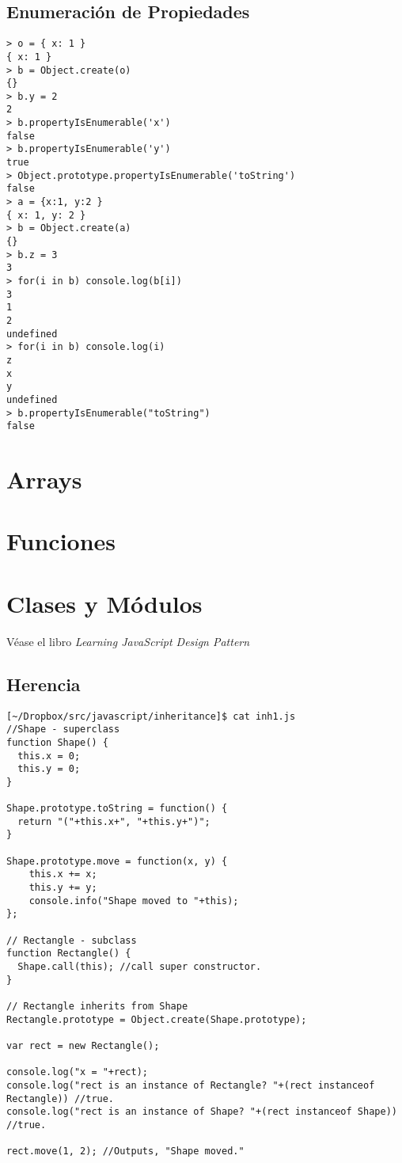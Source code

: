 \section{Enumeración de Propiedades}

\begin{verbatim}
> o = { x: 1 }
{ x: 1 }
> b = Object.create(o)
{}
> b.y = 2
2
> b.propertyIsEnumerable('x')
false
> b.propertyIsEnumerable('y')
true
> Object.prototype.propertyIsEnumerable('toString')
false
> a = {x:1, y:2 }
{ x: 1, y: 2 }
> b = Object.create(a)
{}
> b.z = 3
3
> for(i in b) console.log(b[i])
3
1
2
undefined
> for(i in b) console.log(i)
z
x
y
undefined
> b.propertyIsEnumerable("toString")
false
\end{verbatim}

\chapter{Arrays}

\chapter{Funciones}


\chapter{Clases y Módulos}
Véase el libro {\it Learning JavaScript Design Pattern}
\cite{osmani2012learning}

\section{Herencia}

\begin{verbatim}
[~/Dropbox/src/javascript/inheritance]$ cat inh1.js 
//Shape - superclass
function Shape() {
  this.x = 0;
  this.y = 0;
}
 
Shape.prototype.toString = function() {
  return "("+this.x+", "+this.y+")";
}

Shape.prototype.move = function(x, y) {
    this.x += x;
    this.y += y;
    console.info("Shape moved to "+this);
};
 
// Rectangle - subclass
function Rectangle() {
  Shape.call(this); //call super constructor.
}
 
// Rectangle inherits from Shape
Rectangle.prototype = Object.create(Shape.prototype);
 
var rect = new Rectangle();
 
console.log("x = "+rect);
console.log("rect is an instance of Rectangle? "+(rect instanceof Rectangle)) //true.
console.log("rect is an instance of Shape? "+(rect instanceof Shape))         //true.
 
rect.move(1, 2); //Outputs, "Shape moved."
\end{verbatim}

